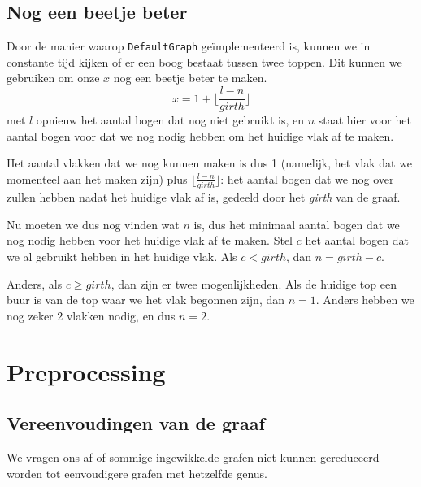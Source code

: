 \documentclass{article}
\begin{document}
\subsection{Nog een beetje beter}
Door de manier waarop \verb#DefaultGraph# ge\"implementeerd is, kunnen we
in constante tijd kijken of er een boog bestaat tussen twee toppen. Dit kunnen
we gebruiken om onze $x$ nog een beetje beter te maken.
\begin{equation*}
x = 1 + \lfloor\frac{l - n}{girth}\rfloor
\end{equation*}
met $l$ opnieuw het aantal bogen dat nog niet gebruikt is, en $n$ staat hier
voor het aantal bogen voor dat we nog nodig hebben om het huidige vlak af te
maken.
\newline

Het aantal vlakken dat we nog kunnen maken is dus 1 (namelijk, het vlak dat we
momenteel aan het maken zijn) plus $\lfloor\frac{l - n}{girth}\rfloor$:
het aantal bogen dat we nog over zullen hebben nadat het huidige vlak af is,
gedeeld door het \emph{girth} van de graaf.
\newline

Nu moeten we dus nog vinden wat $n$ is, dus het minimaal aantal bogen dat we
nog nodig hebben voor het huidige vlak af te maken. Stel $c$ het aantal bogen
dat we al gebruikt hebben in het huidige vlak. Als $c < girth$, dan
$n = girth - c$.
\newline

Anders, als $c \geq girth$, dan zijn er twee mogenlijkheden. Als de huidige top
een buur is van de top waar we het vlak begonnen zijn, dan $n = 1$. Anders
hebben we nog zeker 2 vlakken nodig, en dus $n = 2$.

\section{Preprocessing}
\label{preprocessing}

\subsection{Vereenvoudingen van de graaf}
We vragen ons af of sommige ingewikkelde grafen niet kunnen gereduceerd worden
tot eenvoudigere grafen met hetzelfde genus.
\end{document}
